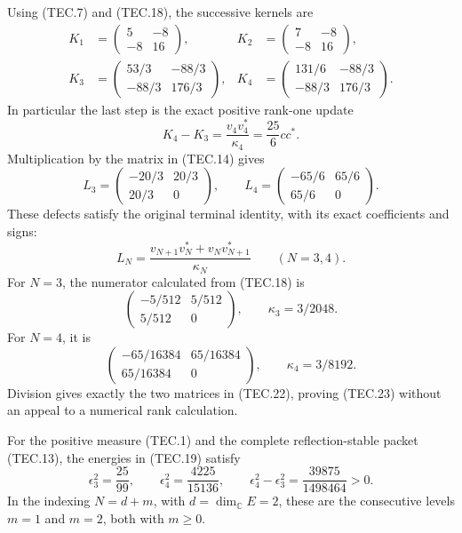 Using (TEC.7) and (TEC.18), the successive kernels are
\[
\begin{aligned}
 K_1&=\begin{pmatrix}5&-8\\-8&16\end{pmatrix},&
 K_2&=\begin{pmatrix}7&-8\\-8&16\end{pmatrix},\\
 K_3&=\begin{pmatrix}53/3&-88/3\\-88/3&176/3\end{pmatrix},&
 K_4&=\begin{pmatrix}131/6&-88/3\\-88/3&176/3\end{pmatrix}.
\end{aligned}                                                     \tag{TEC.20}
\]
In particular the last step is the exact positive rank-one update
\[
 K_4-K_3=\frac{v_4v_4^*}{\kappa_4}
          =\frac{25}{6}cc^*.                                    \tag{TEC.21}
\]
Multiplication by the matrix in (TEC.14) gives
\[
 L_3=\begin{pmatrix}-20/3&20/3\\20/3&0\end{pmatrix},\qquad
 L_4=\begin{pmatrix}-65/6&65/6\\65/6&0\end{pmatrix}.             \tag{TEC.22}
\]
These defects satisfy the original terminal identity, with its exact
coefficients and signs:
\[
 L_N=\frac{v_{N+1}v_N^*+v_Nv_{N+1}^*}{\kappa_N}
                  \qquad(N=3,4).                               \tag{TEC.23}
\]
For \(N=3\), the numerator calculated from (TEC.18) is
\[
 \begin{pmatrix}-5/512&5/512\\5/512&0\end{pmatrix},
 \qquad \kappa_3=3/2048.
\]
For \(N=4\), it is
\[
 \begin{pmatrix}-65/16384&65/16384\\65/16384&0\end{pmatrix},
 \qquad \kappa_4=3/8192.
\]
Division gives exactly the two matrices in (TEC.22), proving
(TEC.23) without an appeal to a numerical rank calculation.

\begin{theorem}
For the positive measure (TEC.1) and the complete reflection-stable
packet (TEC.13), the energies in (TEC.19) satisfy
\[
 \epsilon_3^2=\frac{25}{99},\qquad
 \epsilon_4^2=\frac{4225}{15136},\qquad
 \epsilon_4^2-\epsilon_3^2=\frac{39875}{1498464}>0.
                                                                    \tag{TEC.24}
\]
In the indexing \(N=d+m\), with \(d=\dim_{\mathbb C}E=2\), these
are the consecutive levels \(m=1\) and \(m=2\), both with
\(m\geq0\).
\end{theorem}


